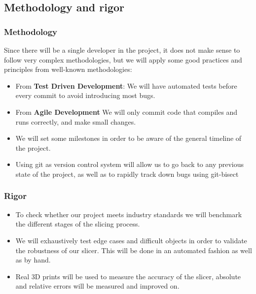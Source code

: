 \subsection{Methodology and rigor}

\subsubsection{Methodology}
Since there will be a single developer in the project, it does not make sense to follow very complex methodologies, but we will apply some good practices and principles from well-known methodologies:
\begin{itemize}
    \item From \textbf{Test Driven Development}: We will have automated tests before every commit to avoid introducing most bugs.
    \item From \textbf{Agile Development} We will only commit code that compiles and runs correctly, and make small changes.
    \item We will set some milestones in order to be aware of the general timeline of the project.
    \item Using git as version control system will allow us to go back to any previous state of the project, as well as to rapidly track down bugs using git-bisect \cite{git-bisect}
\end{itemize}

\subsubsection{Rigor}
\begin{itemize}
    \item To check whether our project meets industry standards we will benchmark the different stages of the slicing process.
    \item We will exhaustively test edge cases and difficult objects in order to validate the robustness of our slicer. This will be done in an automated fashion as well as by hand.
    \item Real 3D prints will be used to measure the accuracy of the slicer, absolute and relative errors will be measured and improved on.
\end{itemize}


